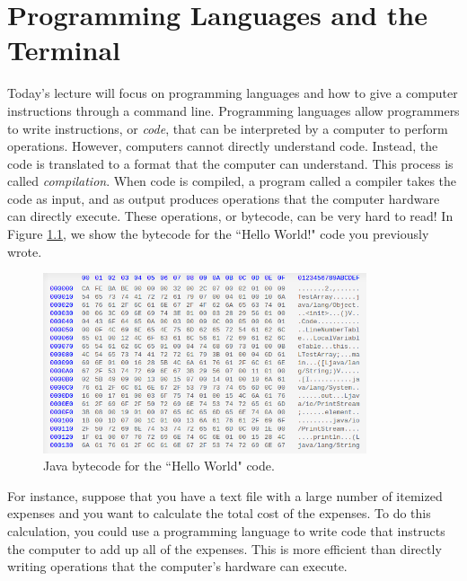 \chapter{Programming Languages and the Terminal}\label{chap:proglang_linux}

Today's lecture will focus on programming languages and how to give a computer instructions through a command line. Programming languages allow programmers to write instructions, or \emph{code}, that can be interpreted by a computer to perform operations. However, computers cannot directly understand code. Instead, the code is translated to a format that the computer can understand. This process is called \emph{compilation}. When code is compiled, a program called a compiler takes the code as input, and as output produces operations that the computer hardware can directly execute. These operations, or bytecode, can be very hard to read! In Figure \ref{fig:ch8:bytecode}, we show the bytecode for the ``Hello World!" code you previously wrote.

\begin{figure}
	\centering
	\includegraphics[width=0.85\textwidth]{images/java-bytecode-example.png}
	\caption{Java bytecode for the ``Hello World" code.}
	\label{fig:ch8:bytecode}
\end{figure}


For instance, suppose that you have a text file with a large number of itemized expenses and you want to calculate the total cost of the expenses. To do this calculation, you could use a programming language to write code that instructs the computer to add up all of the expenses. This is more efficient than directly writing operations that the computer’s hardware can execute. \\ 

